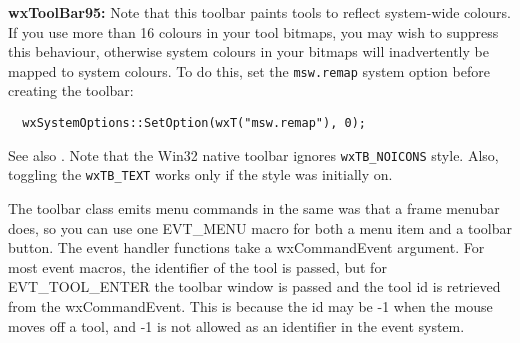 {\bf wxToolBar95:} Note that this toolbar paints tools to reflect system-wide colours.
If you use more than 16 colours in your tool bitmaps, you may wish to suppress
this behaviour, otherwise system colours in your bitmaps will inadvertently be
mapped to system colours. To do this, set the {\tt msw.remap} system option
before creating the toolbar:

\begin{verbatim}
  wxSystemOptions::SetOption(wxT("msw.remap"), 0);
\end{verbatim}


\twocolwidtha{5cm}
\begin{twocollist}\itemsep=0pt
\end{twocollist}

See also . Note that the Win32
native toolbar ignores {\tt wxTB\_NOICONS} style. Also, toggling the 
{\tt wxTB\_TEXT} works only if the style was initially on.


The toolbar class emits menu commands in the same was that a frame menubar does,
so you can use one EVT\_MENU macro for both a menu item and a toolbar button.
The event handler functions take a wxCommandEvent argument. For most event macros,
the identifier of the tool is passed, but for EVT\_TOOL\_ENTER the toolbar
window is passed and the tool id is retrieved from the wxCommandEvent.
This is because the id may be -1 when the mouse moves off a tool, and -1 is not
allowed as an identifier in the event system.

